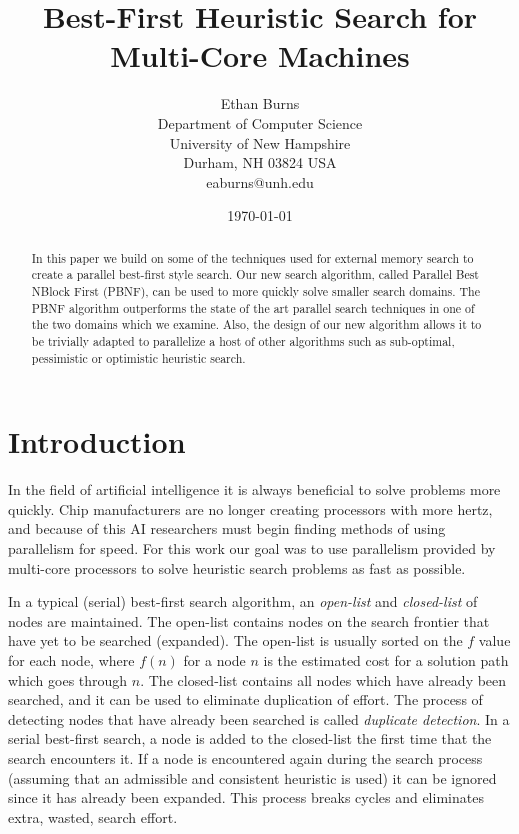 \documentclass{article}
\title{Best-First Heuristic Search for Multi-Core Machines}
\author{Ethan Burns \\
   Department of Computer Science \\
   University of New Hampshire \\
   Durham, NH 03824 USA \\
   eaburns@unh.edu}
\date{\today}
\begin{document}
 \maketitle

 \begin{abstract}
   In this paper we build on some of the techniques used for external
   memory search to create a parallel best-first style search.  Our new
   search algorithm, called Parallel Best NBlock First (PBNF), can be
   used to more quickly solve smaller search domains.  The PBNF
   algorithm outperforms the state of the art parallel search
   techniques in one of the two domains which we examine.  Also, the
   design of our new algorithm allows it to be trivially adapted to
   parallelize a host of other algorithms such as sub-optimal,
   pessimistic or optimistic heuristic search.
 \end{abstract}

 \section{Introduction}

 In the field of artificial intelligence it is always beneficial to
 solve problems more quickly.  Chip manufacturers are no longer
 creating processors with more hertz, and because of this AI
 researchers must begin finding methods of using parallelism for speed.
 For this work our goal was to use parallelism provided by multi-core
 processors to solve heuristic search problems as fast as possible.

 In a typical (serial) best-first search algorithm, an \emph{open-list}
 and \emph{closed-list} of nodes are maintained.  The open-list
 contains nodes on the search frontier that have yet to be searched
 (expanded).  The open-list is usually sorted on the $f$ value for each
 node, where $f(n)$ for a node $n$ is the estimated cost for a solution
 path which goes through $n$.  The closed-list contains all nodes which
 have already been searched, and it can be used to eliminate
 duplication of effort.  The process of detecting nodes that have
 already been searched is called \emph{duplicate detection}.  In a
 serial best-first search, a node is added to the closed-list the first
 time that the search encounters it.  If a node is encountered again
 during the search process (assuming that an admissible and consistent
 heuristic is used) it can be ignored since it has already been
 expanded.  This process breaks cycles and eliminates extra, wasted,
 search effort.
\end{document}
